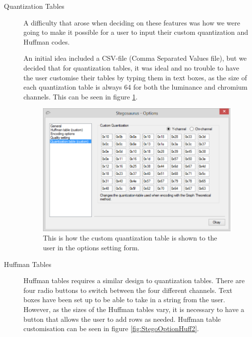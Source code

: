 \begin{description}
\item[Quantization Tables]
A difficulty that arose when deciding on these features was how we were going to make it possible for a user to input their custom quantization and Huffman codes.

An initial idea included a CSV-file (Comma Separated Values file), but we decided that for quantization tables, it was ideal and no trouble to have the user customise their tables by typing them in text boxes, as the size of each quantization table is always 64 for both the luminance and chromium channels. This can be seen in figure \ref{fig:StegoOptionQuant}.


\begin{figure}
	\centering
	\includegraphics[width=1\textwidth]{figures/StegoOptionQuant.png}
	\caption{This is how the custom quantization table is shown to the user in the options setting form.}
	\label{fig:StegoOptionQuant}
\end{figure}

\item[Huffman Tables]

Huffman tables requires a similar design to quantization tables. There are four radio buttons to switch between the four different channels. Text boxes have been set up to be able to take in a string from the user. However, as the sizes of the Huffman tables vary, it is necessary to have a button that allows the user to add rows as needed. Huffman table customisation can be seen in figure \ref{fig:StegoOptionHuff2}.



\end{description}
